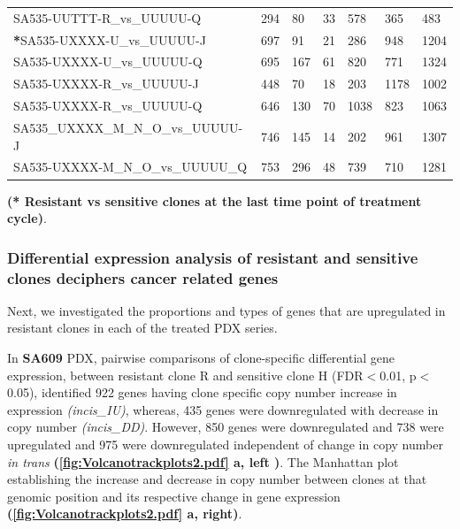 \begin{landscape}
\begin{table}
{\begin{tabular}{|l|p{3.8em}|p{3.8em}|p{3.8em}|p{3.8em}|p{3.8em}|p{3.8em}|}
SA535-UUTTT-R\_vs\_UUUUU-Q         & 294 & 80  & 33  & 578  & 365  & 483  \\
\textbf{*}SA535-UXXXX-U\_vs\_UUUUU-J         & 697 & 91  & 21  & 286  & 948  & 1204 \\
SA535-UXXXX-U\_vs\_UUUUU-Q         & 695 & 167 & 61  & 820  & 771  & 1324 \\
SA535-UXXXX-R\_vs\_UUUUU-J         & 448 & 70  & 18  & 203  & 1178 & 1002 \\
SA535-UXXXX-R\_vs\_UUUUU-Q         & 646 & 130 & 70  & 1038 & 823  & 1063 \\
SA535\_UXXXX\_M\_N\_O\_vs\_UUUUU-J & 746 & 145 & 14  & 202  & 961  & 1307 \\
SA535-UXXXX-M\_N\_O\_vs\_UUUUU\_Q  & 753 & 296 & 48  & 739  & 710  & 1281 \\
  \hline

\end{tabular}
}

\label{tab:numberofDEgenesincistrans}

  \small\textbf{(* Resistant vs sensitive clones at the last time point of treatment cycle)}.
\end{table}
\end{landscape}

 \subsubsection{Differential expression analysis of resistant and sensitive clones deciphers cancer related genes}
 Next, we investigated the proportions and types of genes that are upregulated in resistant clones in each of the treated PDX series.
 
 In \textbf{SA609} PDX, pairwise comparisons of clone-specific differential gene expression, between resistant clone R and sensitive clone H (FDR$<$0.01, p$<$0.05), identified 922 genes having clone specific copy number increase in expression \textit{(incis\_IU)}, whereas, 435 genes were downregulated with decrease in copy number \textit{(incis\_DD)}. However, 850 genes were downregulated and 738 were upregulated and 975 were downregulated independent of change in copy number \textit{in trans} \textbf{(\autoref{fig:Volcanotrackplots2.pdf} a, left )}. The Manhattan plot establishing the increase and decrease in copy number between clones at that genomic position and its respective change in gene expression \textbf{(\autoref{fig:Volcanotrackplots2.pdf} a, right)}.
 
